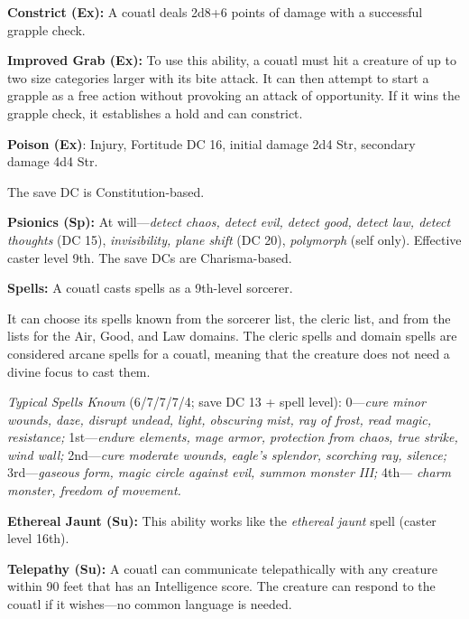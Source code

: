 \documentclass{article}
\begin{document}
\textbf{Constrict (Ex):} A couatl deals 2d8+6 points of damage with a successful 
grapple check.

\textbf{Improved Grab (Ex): }To use this ability, a couatl must hit a creature 
of up to two size categories larger with its bite attack. It can then attempt to 
start a grapple as a free action without provoking an attack of opportunity. If 
it wins the grapple check, it establishes a hold and can constrict.

\textbf{Poison (Ex)}: Injury, Fortitude DC 16, initial damage 2d4 Str, secondary 
damage 4d4 Str.

The save DC is Constitution-based.

\textbf{Psionics (Sp):} At will---\textit{detect chaos, detect evil, detect good, 
detect law, detect thoughts }(DC 15), \textit{invisibility, plane shift }(DC 20), 
\textit{polymorph }(self only). Effective caster level 9th. The save DCs are Charisma-based.

\textbf{Spells:} A couatl casts spells as a 9th-level sorcerer.

It can choose its spells known from the sorcerer list, the cleric list, and from 
the lists for the Air, Good, and Law domains. The cleric spells and domain spells 
are considered arcane spells for a couatl, meaning that the creature does not need 
a divine focus to cast them.

\textit{Typical Spells Known }(6/7/7/7/4; save DC 13 + spell level): 0---\textit{cure 
minor wounds, daze, disrupt undead, light, obscuring mist, ray of frost, read magic, 
resistance; }1st---\textit{endure elements, mage armor, protection from chaos, 
true strike, wind wall; }2nd---\textit{cure moderate wounds, eagle's splendor, 
scorching ray, silence; }3rd---\textit{gaseous form, magic circle against evil, 
summon monster III; }4th--- \textit{charm monster, freedom of movement.}

\textbf{Ethereal Jaunt (Su):} This ability works like the \textit{ethereal jaunt 
}spell (caster level 16th).

\textbf{Telepathy (Su):} A couatl can communicate telepathically with any creature 
within 90 feet that has an Intelligence score. The creature can respond to the 
couatl if it wishes---no common language is needed.

\newpage
\end{document}
